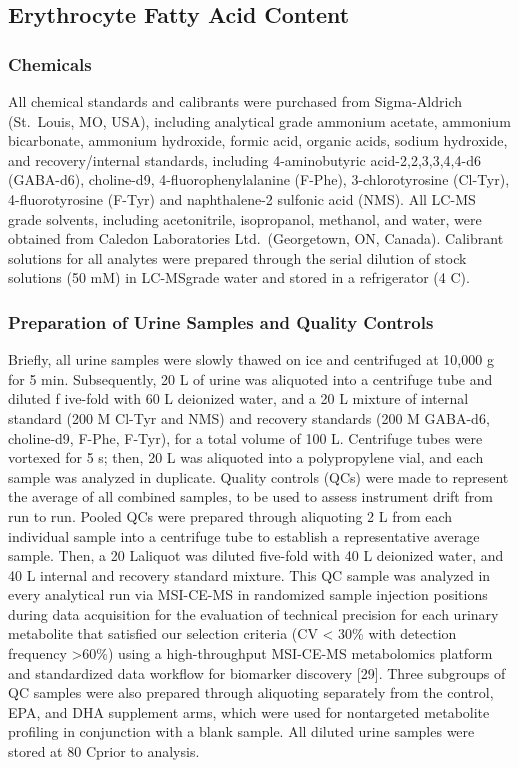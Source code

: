 \documentclass[journal=jacsat,manuscript=article]{achemso}
\begin{document}
\subsection{Erythrocyte Fatty Acid
Content}\label{erythrocyte-fatty-acid-content-1}

\subsubsection{Chemicals}\label{chemicals}

All chemical standards and calibrants were purchased from Sigma-Aldrich
(St.~Louis, MO, USA), including analytical grade ammonium acetate,
ammonium bicarbonate, ammonium hydroxide, formic acid, organic acids,
sodium hydroxide, and recovery/internal standards, including
4-aminobutyric acid-2,2,3,3,4,4-d6 (GABA-d6), choline-d9,
4-fluorophenylalanine (F-Phe), 3-chlorotyrosine (Cl-Tyr),
4-fluorotyrosine (F-Tyr) and naphthalene-2 sulfonic acid (NMS). All
LC-MS grade solvents, including acetonitrile, isopropanol, methanol, and
water, were obtained from Caledon Laboratories Ltd.~(Georgetown, ON,
Canada). Calibrant solutions for all analytes were prepared through the
serial dilution of stock solutions (50 mM) in LC-MSgrade water and
stored in a refrigerator (4 C).

\subsubsection{Preparation of Urine Samples and Quality
Controls}\label{preparation-of-urine-samples-and-quality-controls}

Briefly, all urine samples were slowly thawed on ice and centrifuged at
10,000 g for 5 min. Subsequently, 20 L of urine was aliquoted into a
centrifuge tube and diluted f ive-fold with 60 L deionized water, and a
20 L mixture of internal standard (200 M Cl-Tyr and NMS) and recovery
standards (200 M GABA-d6, choline-d9, F-Phe, F-Tyr), for a total volume
of 100 L. Centrifuge tubes were vortexed for 5 s; then, 20 L was
aliquoted into a polypropylene vial, and each sample was analyzed in
duplicate. Quality controls (QCs) were made to represent the average of
all combined samples, to be used to assess instrument drift from run to
run. Pooled QCs were prepared through aliquoting 2 L from each
individual sample into a centrifuge tube to establish a representative
average sample. Then, a 20 Laliquot was diluted five-fold with 40 L
deionized water, and 40 L internal and recovery standard mixture. This
QC sample was analyzed in every analytical run via MSI-CE-MS in
randomized sample injection positions during data acquisition for the
evaluation of technical precision for each urinary metabolite that
satisfied our selection criteria (CV \textless{} 30\% with detection
frequency \textgreater60\%) using a high-throughput MSI-CE-MS
metabolomics platform and standardized data workflow for biomarker
discovery {[}29{]}. Three subgroups of QC samples were also prepared
through aliquoting separately from the control, EPA, and DHA supplement
arms, which were used for nontargeted metabolite profiling in
conjunction with a blank sample. All diluted urine samples were stored
at 80 Cprior to analysis.
\end{document}
